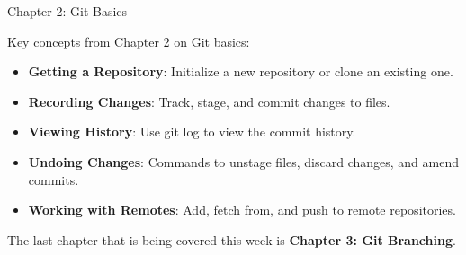\begin{notes}{Chapter 2: Git Basics}
\begin{highlight}
    \end{highlight}
    
    \begin{highlight}
    
        Key concepts from Chapter 2 on Git basics:
        
        \begin{itemize}
            \item \textbf{Getting a Repository}: Initialize a new repository or clone an existing one.
            \item \textbf{Recording Changes}: Track, stage, and commit changes to files.
            \item \textbf{Viewing History}: Use git log to view the commit history.
            \item \textbf{Undoing Changes}: Commands to unstage files, discard changes, and amend commits.
            \item \textbf{Working with Remotes}: Add, fetch from, and push to remote repositories.
        \end{itemize}
        
    \end{highlight}
\end{notes}

The last chapter that is being covered this week is \textbf{Chapter 3: Git Branching}.

